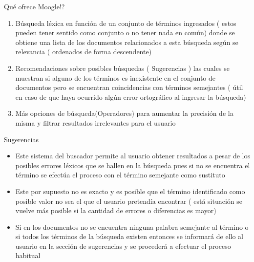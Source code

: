 \documentclass[options]{beamer}
\begin{document}
\begin{frame}{Qué ofrece Moogle!?}
    \begin{enumerate}
        \item Búsqueda léxica en función de un conjunto de términos ingresados ( estos pueden tener sentido como conjunto o no tener nada en común) donde se obtiene una lista de los documentos relacionados a esta búsqueda según se relevancia ( ordenados de forma descendente)
        \item Recomendaciones sobre posibles búsquedas ( Sugerencias ) las cuales se muestran si alguno de los términos es inexistente en el conjunto de documentos pero se encuentran coincidencias con términos semejantes ( útil en caso de que haya ocurrido algún error ortográfico al ingresar la búsqueda)
        \item Más opciones de búsqueda(Operadores) para aumentar la precisión de la misma y filtrar resultados irrelevantes para el usuario
    \end{enumerate}
\end{frame}
\begin{frame}{Sugerencias}
    \begin{itemize}
        \item Este sistema del buscador permite al usuario obtener resultados a pesar de los posibles errores léxicos que se hallen en la búsqueda pues si no se encuentra el término se efectúa el proceso con el término semejante como sustituto
        \item Este por supuesto no es exacto y es posible que el término identificado como posible valor no sea el que el usuario pretendía encontrar ( está situación se vuelve más posible si la cantidad de errores o diferencias es mayor)
        \item Si en los documentos no se encuentra ninguna palabra semejante al término o si todos los términos de la búsqueda existen entonces se informará de ello al usuario en la sección de sugerencias y se procederá a efectuar el proceso habitual
    \end{itemize}
\end{frame}
\end{document}
